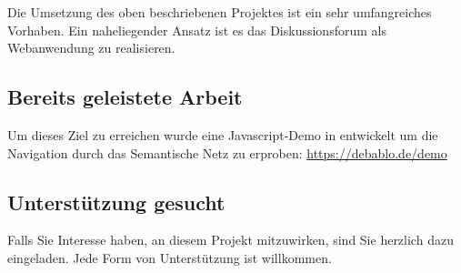 \documentclass{article}
\begin{document}
	Die Umsetzung des oben beschriebenen Projektes ist ein sehr umfangreiches Vorhaben. Ein naheliegender Ansatz ist es das Diskussionsforum als Webanwendung zu realisieren.
	
	\subsection{Bereits geleistete Arbeit}
	
	Um dieses Ziel zu erreichen wurde eine Javascript-Demo in entwickelt um die Navigation durch das Semantische Netz zu erproben: \href{https://debablo.de/demo}{https://debablo.de/demo}
	
	\subsection{Unterstützung gesucht}
	
	Falls Sie Interesse haben, an diesem Projekt mitzuwirken, sind Sie herzlich dazu eingeladen. Jede Form von Unterstützung ist willkommen.
	
	
\end{document}
